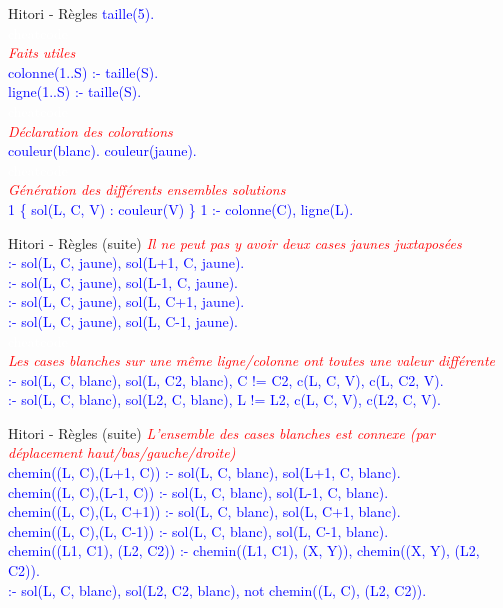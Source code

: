 \documentclass{beamer}
\begin{document}
\begin{frame}{Hitori - Règles}
	\textcolor{blue}{
	\pause
	taille(5).\\
	\pause
	\textcolor{white}{cheatcode}\\
	\textcolor{red}{\emph{Faits utiles}}\\
	colonne(1..S) :- taille(S).\\
	ligne(1..S) :- taille(S).\\
	\pause
	\textcolor{white}{cheatcode}\\
	\textcolor{red}{\emph{Déclaration des colorations}}\\
	couleur(blanc). couleur(jaune).\\
	\pause
	\textcolor{white}{cheatcode}\\
	\textcolor{red}{\emph{Génération des différents ensembles solutions}}\\
	1 \{ sol(L, C, V) : couleur(V) \} 1 :- colonne(C), ligne(L).}\\
\end{frame}

\begin{frame}{Hitori - Règles (suite)}
	\pause
	\textcolor{red}{\emph{Il ne peut pas y avoir deux cases jaunes juxtaposées}}\\
	\textcolor{blue}{:- sol(L, C, jaune), sol(L+1, C, jaune).\\
	\pause
	:- sol(L, C, jaune), sol(L-1, C, jaune).\\
	:- sol(L, C, jaune), sol(L, C+1, jaune).\\
	:- sol(L, C, jaune), sol(L, C-1, jaune).\\
	\pause
	\textcolor{white}{cheatcode}\\
	\textcolor{red}{\emph{Les cases blanches sur une même ligne/colonne ont toutes une valeur différente}}\\
	:- sol(L, C, blanc), sol(L, C2, blanc), C != C2, c(L, C, V), c(L, C2, V).\\
	\pause
	:- sol(L, C, blanc), sol(L2, C, blanc), L != L2, c(L, C, V), c(L2, C, V).}\\
\end{frame}

\begin{frame}{Hitori - Règles (suite)}
	\pause
	\textcolor{red}{\emph{L'ensemble des cases blanches est connexe (par déplacement haut/bas/gauche/droite)}}\\
	\textcolor{blue}{chemin((L, C),(L+1, C)) :- sol(L, C, blanc), sol(L+1, C, blanc).\\
	\pause
	chemin((L, C),(L-1, C)) :- sol(L, C, blanc), sol(L-1, C, blanc).\\
	chemin((L, C),(L, C+1)) :- sol(L, C, blanc), sol(L, C+1, blanc).\\
	chemin((L, C),(L, C-1)) :- sol(L, C, blanc), sol(L, C-1, blanc).\\
	\pause
	chemin((L1, C1), (L2, C2)) :- chemin((L1, C1), (X, Y)), chemin((X, Y), (L2, C2)).\\
	\pause
	:- sol(L, C, blanc), sol(L2, C2, blanc), not chemin((L, C), (L2, C2)).}\\
\end{frame}
\end{document}

